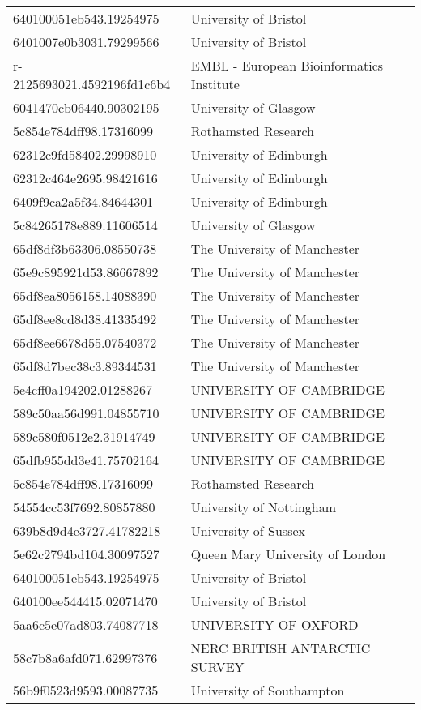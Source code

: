 \begin{tabular}{ll}
640100051eb543.19254975 & University of Bristol \\
6401007e0b3031.79299566 & University of Bristol \\
r-2125693021.4592196fd1c6b4 & EMBL - European Bioinformatics Institute \\
6041470cb06440.90302195 & University of Glasgow \\
5c854e784dff98.17316099 & Rothamsted Research \\
62312c9fd58402.29998910 & University of Edinburgh \\
62312c464e2695.98421616 & University of Edinburgh \\
6409f9ca2a5f34.84644301 & University of Edinburgh \\
5c84265178e889.11606514 & University of Glasgow \\
65df8df3b63306.08550738 & The University of Manchester \\
65e9c895921d53.86667892 & The University of Manchester \\
65df8ea8056158.14088390 & The University of Manchester \\
65df8ee8cd8d38.41335492 & The University of Manchester \\
65df8ee6678d55.07540372 & The University of Manchester \\
65df8d7bec38c3.89344531 & The University of Manchester \\
5e4cff0a194202.01288267 & UNIVERSITY OF CAMBRIDGE \\
589c50aa56d991.04855710 & UNIVERSITY OF CAMBRIDGE \\
589c580f0512e2.31914749 & UNIVERSITY OF CAMBRIDGE \\
65dfb955dd3e41.75702164 & UNIVERSITY OF CAMBRIDGE \\
5c854e784dff98.17316099 & Rothamsted Research \\
54554cc53f7692.80857880 & University of Nottingham \\
639b8d9d4e3727.41782218 & University of Sussex \\
5e62c2794bd104.30097527 & Queen Mary University of London \\
640100051eb543.19254975 & University of Bristol \\
640100ee544415.02071470 & University of Bristol \\
5aa6c5e07ad803.74087718 & UNIVERSITY OF OXFORD \\
58c7b8a6afd071.62997376 & NERC BRITISH ANTARCTIC SURVEY \\
56b9f0523d9593.00087735 & University of Southampton \\

\end{tabular}
